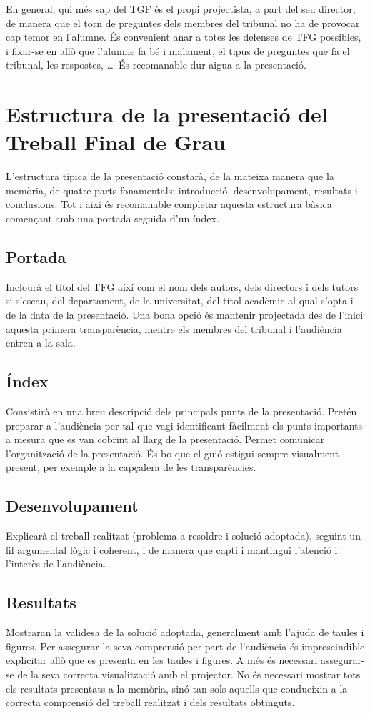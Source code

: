        En general, qui més sap del TGF és el propi projectista, a part del seu director, de manera que el torn de preguntes dels membres del tribunal no ha de provocar cap temor en l'alumne. És convenient anar a totes les defenses de \ac{TFG} possibles, i fixar-se en allò que l'alumne fa bé i malament, el tipus de preguntes que fa el tribunal, les respostes, \ldots\ És recomanable dur aigua a la presentació.

\section{Estructura de la presentació del Treball Final de Grau}

L'estructura típica de la presentació constarà, de la mateixa manera que la memòria, de quatre parts fonamentals: introducció, desenvolupament, resultats i conclusions. Tot i així és recomanable completar aquesta estructura bàsica començant amb una portada seguida d'un índex.
\subsection{Portada} Inclourà el títol del \ac{TFG} així com el nom dels autors, dels directors i dels tutors si s'escau, del departament, de la universitat, del títol acadèmic al qual s'opta i de la data de la presentació. Una bona opció és mantenir projectada des de l'inici aquesta primera transparència, mentre els membres del tribunal i l'audiència entren a la sala.
\subsection{Índex} Consistirà en una breu descripció dels principals punts de la presentació. Pretén preparar a l'audiència per tal que vagi identificant fàcilment els punts importants a mesura que es van cobrint al llarg de la presentació. Permet comunicar l'organització de la presentació. És bo que el guió estigui sempre visualment present, per exemple a la capçalera de les transparències.
\subsection{Desenvolupament} Explicarà el treball realitzat (problema a resoldre i solució adoptada), seguint un fil argumental lògic i coherent, i de manera que capti i mantingui l'atenció i l'interès de l'audiència.
\subsection{Resultats} Mostraran la validesa de la solució adoptada, generalment amb l'ajuda de taules i figures. Per assegurar la seva comprensió per part de l'audiència és imprescindible explicitar allò que es presenta en les taules i figures. A més és necessari assegurar-se de la seva correcta visualització amb el projector. No és necessari mostrar tots els resultats presentats a la memòria, sinó tan sols aquells que condueixin a la correcta comprensió del treball realitzat i dels resultats obtinguts.
